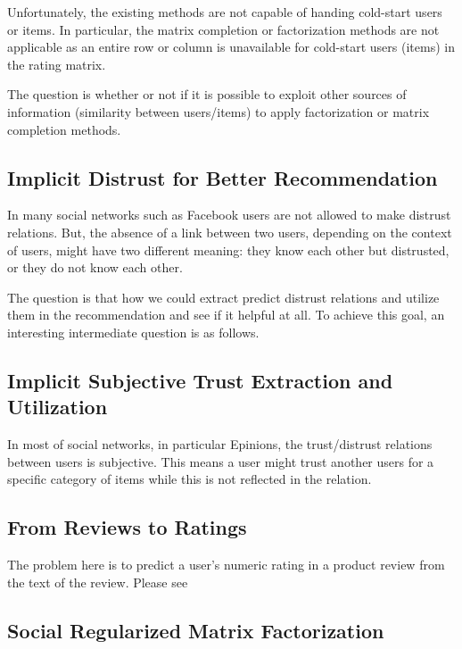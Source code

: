 \documentclass[11pt]{article}
\theoremstyle{definition}
\begin{document}
Unfortunately, the existing methods are not capable of handing cold-start users or items. In particular, the matrix completion or factorization methods are not applicable as an entire row or column is unavailable for cold-start users (items) in the rating matrix. 

The question is whether or not if it is possible to exploit other sources of information (similarity between users/items) to apply factorization or matrix completion methods. 

\subsection{Implicit Distrust for Better  Recommendation}

In many social networks such as Facebook users are not allowed to make distrust relations. But, the absence of a link between two users, depending on the context of users, might have two different meaning: they know each other but distrusted, or they do not know each other. 

The question is that how  we could extract predict distrust relations and utilize them in the recommendation and see if it  helpful at all. To achieve this goal, an interesting intermediate question is as follows. 


\subsection{Implicit Subjective Trust Extraction and Utilization}

In most of social networks, in particular Epinions, the trust/distrust relations between users is subjective. This means a user might trust another users for a specific category of items while this is not reflected in the relation.


\subsection{From Reviews to Ratings}

The problem here  is to predict a user's numeric rating in a product review from the text of the review. Please see~\cite{qu2010bag,li2011incorporating,hai2014identifying}


\subsection{Social Regularized Matrix Factorization}\label{problem:smf}
\end{document}
